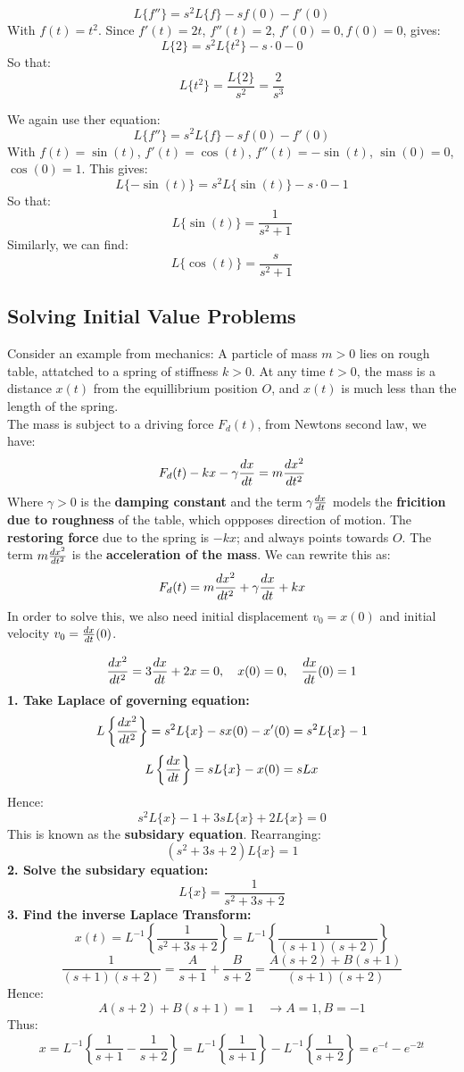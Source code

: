 \documentclass[a4paper, 10pt]{article}
\begin{document}
\begin{examplebox}[Find $L\{t^2\}$ using the fact $L\{s\} = 1/s$ for $s > 0$]
  $$L\{f''\} = s^2 L\{f\} - sf(0) - f'(0)$$
  With $f(t) = t^2$.
  Since $f'(t) = 2t$, $f''(t) = 2$, $f'(0) = 0, f(0) = 0$, gives:
  $$L\{2\} = s^2 L\{t^2\} - s \cdot 0 - 0$$
  So that:
  $$L\{t^2\} = \frac{L\{2\}}{s^2} = \frac{2}{s^3}$$
\end{examplebox}

\begin{examplebox}
  We again use ther equation:
  $$L\{f''\} = s^2 L\{f\} - sf(0) - f'(0)$$
  With $f(t) = \sin(t)$, $f'(t) = \cos(t)$, $f''(t) = -\sin(t)$, $\sin(0) = 0$, $\cos(0) = 1$. This gives:
  $$L\{-\sin(t)\} = s^2 L\{\sin(t)\} - s \cdot 0 - 1$$
  So that:
  $$L\{\sin(t)\} = \frac{1}{s^2 + 1}$$
  Similarly, we can find:
  $$L\{\cos(t)\} = \frac{s}{s^2 + 1}$$
\end{examplebox}
\pagebreak
\subsection{Solving Initial Value Problems}
Consider an example from mechanics: A particle of mass $m > 0$ lies on rough table, attatched to a spring of stiffness $k > 0$. At any time $t > 0$, the mass is a distance $x(t)$ from the equillibrium position $O$, and $x(t)$ is much less than the length of the spring. \\
The mass is subject to a driving force $F_d(t)$, from Newtons second law, we have:
$$F_d(t) - kx - \gamma \frac{dx}{dt} = m \frac{dx^2}{dt^2}$$
Where $\gamma > 0$ is the \textbf{damping constant} and the term $\gamma \frac{dx}{dt}$ models the \textbf{fricition due to roughness} of the table, which oppposes direction of motion. The \textbf{restoring force} due to the spring is $-kx$; and always points towards $O$. The term $m \frac{dx^2}{dt^2}$ is the \textbf{acceleration of the mass}. We can rewrite this as:
$$F_d(t) = m \frac{dx^2}{dt^2} + \gamma \frac{dx}{dt} + kx$$
In order to solve this, we also need initial displacement $v_0 = x(0)$ and initial velocity $v_0 = \frac{dx}{dt}(0)$.

\begin{examplebox}
  \normalsize $$\frac{dx^2}{dt^2} = 3\frac{dx}{dt} + 2x = 0, \quad x(0) = 0, \quad \frac{dx}{dt}(0) = 1$$
  \textbf{1. Take Laplace of governing equation:}
  $$L\left\{\frac{dx^2}{dt^2}\right\} = s^2 L\{x\} - sx(0) - x'(0) = s^2 L\{x\} - 1$$
  $$L\left\{\frac{dx}{dt}\right\} = sL\{x\} - x(0) = sL{x}$$
  Hence:
  $$s^2 L\{x\} - 1 + 3sL\{x\} + 2L\{x\} = 0$$
  This is known as the \textbf{subsidary equation}. Rearranging:
  $$(s^2 + 3s + 2)L\{x\} = 1$$
  \textbf{2. Solve the subsidary equation:}
  $$L\{x\} = \frac{1}{s^2 + 3s + 2}$$
  \textbf{3. Find the inverse Laplace Transform:}
  $$x(t) = L^{-1} \left\{ \frac{1}{s^2 + 3s + 2} \right\} = L^{-1} \left\{ \frac{1}{(s+1)(s+2)}\right\} $$
  $$\frac{1}{(s+1)(s+2)} = \frac{A}{s+1} + \frac{B}{s+2} = \frac{A(s+2) + B(s+1)}{(s+1)(s+2)}$$
  Hence:
  $$A(s+2) + B(s+1) = 1 \quad \rightarrow A = 1, B = -1$$
  Thus:
  $$x = L^{-1} \left\{\frac{1}{s+1} - \frac{1}{s+2}\right\} = L^{-1} \left\{ \frac{1}{s+1}\right\}  - L^{-1}\left\{ \frac{1}{s+2}\right\} = e^{-t} - e^{-2t}$$
\end{examplebox}
\pagebreak
\end{document}
